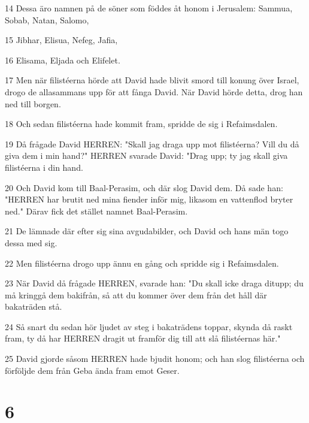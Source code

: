 \par 14 Dessa äro namnen på de söner som föddes åt honom i Jerusalem: Sammua, Sobab, Natan, Salomo,
\par 15 Jibhar, Elisua, Nefeg, Jafia,
\par 16 Elisama, Eljada och Elifelet.
\par 17 Men när filistéerna hörde att David hade blivit smord till konung över Israel, drogo de allasammans upp för att fånga David. När David hörde detta, drog han ned till borgen.
\par 18 Och sedan filistéerna hade kommit fram, spridde de sig i Refaimsdalen.
\par 19 Då frågade David HERREN: "Skall jag draga upp mot filistéerna? Vill du då giva dem i min hand?" HERREN svarade David: "Drag upp; ty jag skall giva filistéerna i din hand.
\par 20 Och David kom till Baal-Perasim, och där slog David dem. Då sade han: "HERREN har brutit ned mina fiender inför mig, likasom en vattenflod bryter ned." Därav fick det stället namnet Baal-Perasim.
\par 21 De lämnade där efter sig sina avgudabilder, och David och hans män togo dessa med sig.
\par 22 Men filistéerna drogo upp ännu en gång och spridde sig i Refaimsdalen.
\par 23 När David då frågade HERREN, svarade han: "Du skall icke draga ditupp; du må kringgå dem bakifrån, så att du kommer över dem från det håll där bakaträden stå.
\par 24 Så snart du sedan hör ljudet av steg i bakaträdens toppar, skynda då raskt fram, ty då har HERREN dragit ut framför dig till att slå filistéernas här."
\par 25 David gjorde såsom HERREN hade bjudit honom; och han slog filistéerna och förföljde dem från Geba ända fram emot Geser.

\chapter{6}

